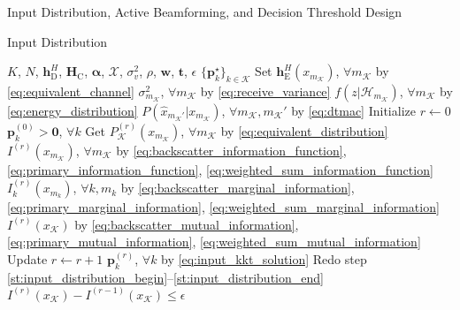 \documentclass[journal]{IEEEtran}
\begin{document}
\begin{section}{Input Distribution, Active Beamforming, and Decision Threshold Design}
\begin{subsection}{Input Distribution}
		\begin{algorithm}[!t]
			\caption{Numerical Evaluation of \gls{kkt} Input Distribution}
			\label{al:input_distribution}
			\begin{algorithmic}[1]
				\Require $K$, $N$, $\boldsymbol{h}_{\mathrm{D}}^H$, $\boldsymbol{H}_{\mathrm{C}}$, $\boldsymbol{\alpha}$, $\mathcal{X}$, $\sigma_v^2$, $\rho$, $\boldsymbol{w}$, $\boldsymbol{t}$, $\epsilon$
				\Ensure $\{\boldsymbol{p}_k^\star\}_{k \in \mathcal{K}}$
				\State Set $\boldsymbol{h}_{\mathrm{E}}^H(x_{m_{\mathcal{K}}})$, $\forall m_{\mathcal{K}}$ by \eqref{eq:equivalent_channel}
				\State \phantom{Set} $\sigma^2_{m_{\mathcal{K}}}$, $\forall m_{\mathcal{K}}$ by \eqref{eq:receive_variance}
				\State \phantom{Set} $f(z|\mathcal{H}_{m_{\mathcal{K}}})$, $\forall m_{\mathcal{K}}$ by \eqref{eq:energy_distribution}
				\State \phantom{Set} $P(\hat{x}_{m_{\mathcal{K}}'}|x_{m_{\mathcal{K}}})$, $\forall m_{\mathcal{K}}, m_{\mathcal{K}}'$ by \eqref{eq:dtmac}
				\State Initialize $r \gets 0$
				\State \phantom{Initialize} $\boldsymbol{p}_k^{(0)} > \boldsymbol{0}$, $\forall k$
				\State Get $P_{\mathcal{K}}^{(r)}(x_{m_{\mathcal{K}}})$, $\forall m_{\mathcal{K}}$ by \eqref{eq:equivalent_distribution} \label{st:input_distribution_begin}
				\State \phantom{Get} $I^{(r)}(x_{m_{\mathcal{K}}})$, $\forall m_{\mathcal{K}}$ by \eqref{eq:backscatter_information_function}, \eqref{eq:primary_information_function}, \eqref{eq:weighted_sum_information_function}
				\State \phantom{Get} $I^{(r)}_k(x_{m_k})$, $\forall k,m_k$ by \eqref{eq:backscatter_marginal_information}, \eqref{eq:primary_marginal_information}, \eqref{eq:weighted_sum_marginal_information}
				\State \phantom{Get} $I^{(r)}(x_{\mathcal{K}})$ by \eqref{eq:backscatter_mutual_information}, \eqref{eq:primary_mutual_information}, \eqref{eq:weighted_sum_mutual_information} \label{st:input_distribution_end}
				\Repeat
					\State Update $r \gets r+1$
					\State \phantom{Update} $\boldsymbol{p}_k^{(r)}$, $\forall k$ by \eqref{eq:input_kkt_solution}
					\State Redo step \ref{st:input_distribution_begin}--\ref{st:input_distribution_end}
				\Until $I^{(r)}(x_{\mathcal{K}}) - I^{(r-1)}(x_{\mathcal{K}}) \le \epsilon$
			\end{algorithmic}
		\end{algorithm}
	\end{subsection}


\end{section}
\end{document}
